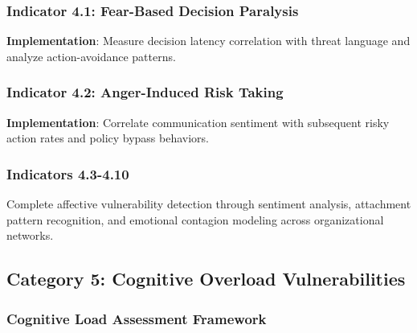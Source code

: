 \documentclass[11pt, onecolumn]{article}
\begin{document}
\subsubsection{Indicator 4.1: Fear-Based Decision Paralysis}

\textbf{Implementation}: Measure decision latency correlation with threat language and analyze action-avoidance patterns.

\subsubsection{Indicator 4.2: Anger-Induced Risk Taking}

\textbf{Implementation}: Correlate communication sentiment with subsequent risky action rates and policy bypass behaviors.

\subsubsection{Indicators 4.3-4.10}

Complete affective vulnerability detection through sentiment analysis, attachment pattern recognition, and emotional contagion modeling across organizational networks.

\subsection{Category 5: Cognitive Overload Vulnerabilities}

\subsubsection{Cognitive Load Assessment Framework}
\end{document}
